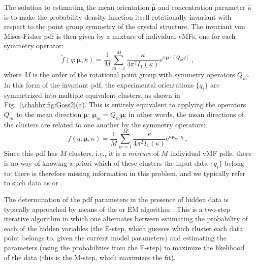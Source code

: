 The solution to estimating the mean orientation $\hat{\bm{\mu}}$ and concentration parameter $\hat{\kappa}$ is to make the probability density function itself rotationally invariant with respect to the point group symmetry of the crystal structure.  The invariant von Mises-Fisher pdf is then given by a mixture of individual vMFs, one for each symmetry operator:
\begin{equation}
	\tilde{f}(q;\bm{\mu},\kappa) = \frac{1}{M} \sum_{m=1}^M \frac{\kappa}{4\pi^2 I_1(\kappa)}\mathrm{e}^{\kappa\,\bm{\mu}\cdot (Q_m q)}\ ,\label{\chabbr:eq:symvMFpdf}
\end{equation}
where $M$ is the order of the rotational point group with symmetry operators $Q_m$. In this form of the invariant pdf, the experimental orientations $\{q_i\}$ are symmetrized into multiple equivalent clusters, as shown in Fig.~\ref{\chabbr:fig:Goss2}(a). This is entirely equivalent to applying the operators $Q_m$ to the mean direction $\bm{\mu}$: $\bm{\mu}_m = Q_m\bm{\mu}$; in other words, the mean directions of the clusters are related to one another by the symmetry operators:
\begin{equation}
	\tilde{f}(q;\bm{\mu},\kappa) = \frac{1}{M} \sum_{m=1}^M \frac{\kappa}{4\pi^2 I_1(\kappa)}\mathrm{e}^{\kappa\bm{\mu}_m\cdot q}\ ,\label{\chabbr:eq:symvMFpdf2}
\end{equation}
Since this pdf has $M$ clusters, i.e., it is a \textit{mixture} of $M$ individual vMF pdfs, there is no way of knowing a-priori which of these clusters the input data $\{q_i\}$ belong to; there is therefore missing information in this problem, and we typically refer to such data as  or .  

The determination of the pdf parameters in the presence of hidden data is typically approached by means of the  or EM algorithm \cite{dempster1977a}.  This is a two-step iterative algorithm in which one alternates between estimating the probability of each of the hidden variables (the E-step, which guesses which cluster each data point belongs to, given the current model parameters) and estimating the parameters (using the probabilities from the E-step) to maximize the likelihood of the data (this is the M-step, which maximizes the fit).  

